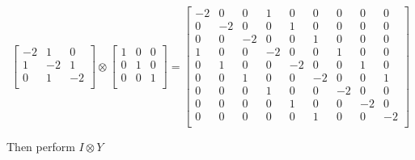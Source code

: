 \documentclass[authoryearcitations]{UoYCSproject}
\begin{document}
\begin{equation}
\begin{bmatrix}
 -2 & 1 & 0 \\
  1 & -2 & 1 \\
  0 & 1 & -2 \\
\end{bmatrix} \otimes \begin{bmatrix}
                        1 & 0 & 0 \\
                        0 & 1 & 0 \\
                        0 & 0 & 1 \\
                      \end{bmatrix} = \begin{bmatrix}
                                        -2 & 0 & 0 & 1 & 0 & 0 & 0 & 0 & 0 \\
                                        0 & -2 & 0 & 0 & 1 & 0 & 0 & 0 & 0 \\ 
                                        0 & 0 & -2 & 0 & 0 & 1 & 0 & 0 & 0 \\
                                        1 & 0 & 0 & -2 & 0 & 0 & 1 & 0 & 0 \\
                                        0 & 1 & 0 & 0 & -2 & 0 & 0 & 1 & 0 \\
                                        0 & 0 & 1 & 0 & 0 & -2 & 0 & 0 & 1 \\
                                        0 & 0 & 0 & 1 & 0 & 0 & -2 & 0 & 0 \\
                                        0 & 0 & 0 & 0 & 1 & 0 & 0 & -2 & 0 \\
                                        0 & 0 & 0 & 0 & 0 & 1 & 0 & 0 & -2 \\
                                      \end{bmatrix}
\label{eq:tensorExample}
\end{equation}

Then perform $I \otimes Y$
\end{document}
